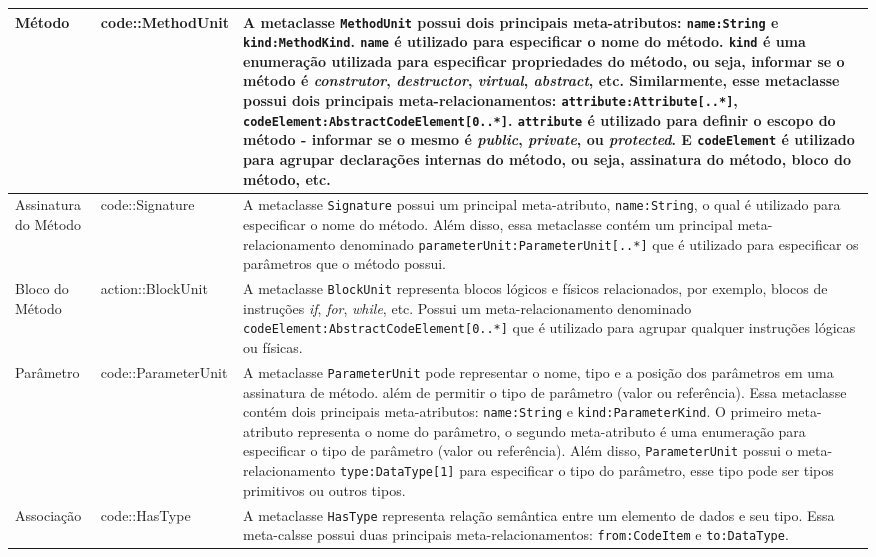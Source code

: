 \begin{longtable}[c]{| m{1.9cm} | m{3.57cm}| m{9.3cm} |}
Método & code::MethodUnit & A metaclasse \texttt{MethodUnit} possui dois principais meta-atributos: \texttt{name:String} e \texttt{kind:MethodKind}. \texttt{name} é utilizado para especificar o nome do método. \texttt{kind} é uma enumeração utilizada para especificar propriedades do método, ou seja, informar se o método é \textit{construtor}, \textit{destructor}, \textit{virtual}, \textit{abstract}, etc. Similarmente, esse metaclasse possui dois principais meta-relacionamentos: \texttt{attribute:Attribute[..*]}, \texttt{codeElement:AbstractCodeElement[0..*]}. \texttt{attribute} é utilizado para definir o escopo do método - informar se o mesmo é \textit{public}, \textit{private}, ou \textit{protected}. E \texttt{codeElement} é utilizado para agrupar declarações internas do método, ou seja, assinatura do método, bloco do método, etc.\\ 
\hline
Assinatura do Método & code::Signature & A metaclasse \texttt{Signature} possui um principal meta-atributo, \texttt{name:String}, o qual é utilizado para especificar o nome do método. Além disso, essa metaclasse contém um principal meta-relacionamento denominado \texttt{parameterUnit:ParameterUnit[..*]} que é utilizado para especificar os parâmetros que o método possui.\\ 
\hline
Bloco do Método & action::BlockUnit & A metaclasse \texttt{BlockUnit} representa blocos lógicos e físicos relacionados, por exemplo, blocos de instruções \textit{if}, \textit{for}, \textit{while}, etc. Possui um meta-relacionamento denominado \texttt{codeElement:AbstractCodeElement[0..*]} que é utilizado para agrupar qualquer instruções lógicas ou físicas.\\ 
\hline
Parâmetro & code::ParameterUnit & A metaclasse \texttt{ParameterUnit} pode representar o nome, tipo e a posição dos parâmetros em uma assinatura de método. além de permitir o tipo de parâmetro (valor ou referência). Essa metaclasse contém dois principais meta-atributos: \texttt{name:String} e \texttt{kind:ParameterKind}. O primeiro meta-atributo representa o nome do parâmetro, o segundo meta-atributo é uma enumeração para especificar o tipo de parâmetro (valor ou referência). Além disso, \texttt{ParameterUnit} possui o meta-relacionamento \texttt{type:DataType[1]} para especificar o tipo do parâmetro, esse tipo pode ser tipos primitivos ou outros tipos.\\ 
\hline
Associação & code::HasType & A metaclasse \texttt{HasType} representa relação semântica entre um elemento de dados e seu tipo. Essa meta-calsse possui duas principais meta-relacionamentos: \texttt{from:CodeItem} e \texttt{to:DataType}.\\ 

\end{longtable}
